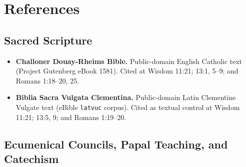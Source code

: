\section{References}

\subsection*{Sacred Scripture}

\begin{itemize}
\item \textbf{Challoner Douay-Rheims Bible.} Public-domain English Catholic text (Project Gutenberg eBook 1581). Cited at Wisdom 11:21; 13:1, 5--9; and Romans 1:18--20, 25.
\item \textbf{Biblia Sacra Vulgata Clementina.} Public-domain Latin Clementine Vulgate text (eBible \texttt{latvuc} corpus). Cited as textual control at Wisdom 11:21; 13:5, 9; and Romans 1:19--20.
\end{itemize}

\subsection*{Ecumenical Councils, Papal Teaching, and Catechism}


